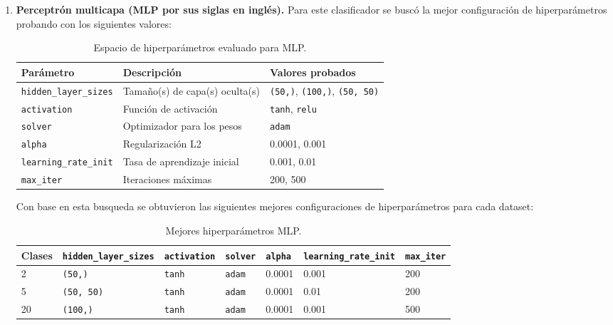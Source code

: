 \documentclass[12pt,a4paper]{article}
\begin{document}
\begin{enumerate}
   \item \textbf{Perceptrón multicapa (MLP por sus siglas en inglés).}
   Para este clasificador se buscó la mejor configuración de hiperparámetros probando con los siguientes valores:

   \begin{table}[htbp]
    \centering\small
    \setlength{\tabcolsep}{4pt}
    \begin{tabularx}{\linewidth}{@{}l l X@{}}
      \toprule
      \textbf{Parámetro} & \textbf{Descripción} & \textbf{Valores probados} \\
      \midrule
      \texttt{hidden\_layer\_sizes} & Tamaño(s) de capa(s) oculta(s) & \texttt{(50,)}, \texttt{(100,)}, \texttt{(50, 50)} \\
      \texttt{activation}           & Función de activación          & \texttt{tanh}, \texttt{relu} \\
      \texttt{solver}               & Optimizador para los pesos     & \texttt{adam} \\
      \texttt{alpha}                & Regularización L2              & 0.0001, 0.001 \\
      \texttt{learning\_rate\_init} & Tasa de aprendizaje inicial    & 0.001, 0.01 \\
      \texttt{max\_iter}            & Iteraciones máximas            & 200, 500 \\
      \bottomrule
    \end{tabularx}
    \caption{Espacio de hiperparámetros evaluado para MLP.}
    \label{tab:param_mlp_ranges_fit}
  \end{table}

   Con base en esta busqueda se obtuvieron las siguientes mejores configuraciones de hiperparámetros para cada dataset:

  \begin{table}[htbp]
    \centering\small
    \setlength{\tabcolsep}{4pt}
    \begin{tabularx}{\linewidth}{@{}l l l l l l l@{}}
      \toprule
      \textbf{Clases} & \textbf{\texttt{hidden\_layer\_sizes}} & \textbf{\texttt{activation}} & \textbf{\texttt{solver}} & \textbf{\texttt{alpha}} & \textbf{\texttt{learning\_rate\_init}} & \textbf{\texttt{max\_iter}} \\
      \midrule
      2  & \texttt{(50,)}     & \texttt{tanh} & \texttt{adam} & 0.0001 & 0.001 & 200 \\
      5  & \texttt{(50, 50)}  & \texttt{tanh} & \texttt{adam} & 0.0001 & 0.01  & 200 \\
      20 & \texttt{(100,)}    & \texttt{tanh} & \texttt{adam} & 0.0001 & 0.001 & 500 \\
      \bottomrule
    \end{tabularx}
    \caption{Mejores hiperparámetros MLP.}
    \label{tab:best_hparams_mlp}
  \end{table}


\end{enumerate}
\end{document}
